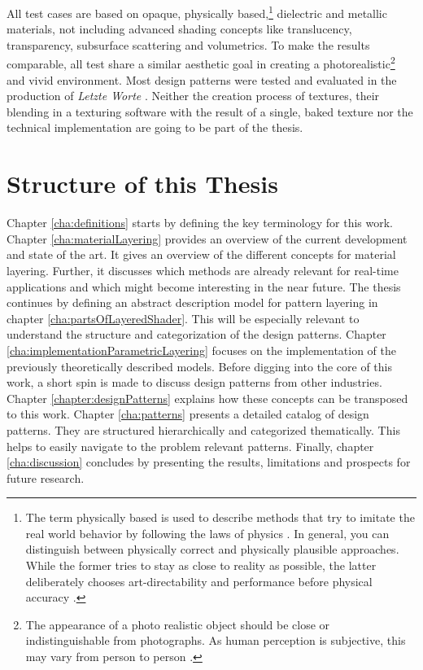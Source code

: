 All test cases are based on opaque, physically based,\footnote{The term physically based is used to describe  methods that try to imitate the real world behavior by following the laws of physics \cite[p.\,1]{pharr2016physically}. In general, you can distinguish between physically correct and physically plausible approaches. While the former tries to stay as close to reality as possible, the latter deliberately chooses art-directability and performance before physical accuracy \cite[p.\,12]{burley2012physically}\cite[p.\,2]{wes2018comprehensivevol2}.} dielectric and metallic materials, not including advanced shading concepts like translucency, transparency, subsurface scattering and volumetrics. To make the results comparable, all test share a similar aesthetic goal in creating a photorealistic\footnote{The appearance of a photo realistic object should be close or indistinguishable from photographs. As human perception is subjective, this may vary from person to person \cite[p.\,4]{pharr2016physically}\cite[p.\,99]{akenine2008real}.} and vivid environment. Most design patterns were tested and evaluated in the production of \emph{Letzte Worte} \cite{letzteWorte2019game}. Neither the creation process of textures, their blending in a texturing software with the result of a single, baked texture nor the technical implementation are going to be part of the thesis.

 

\section{Structure of this Thesis}

Chapter \ref{cha:definitions} starts by defining the key terminology for this work. Chapter \ref{cha:materialLayering} provides an overview of the current development and state of the art. It gives an overview of the different concepts for material layering. Further, it discusses which methods are already relevant for real-time applications and which might become interesting in the near future. The thesis continues  by defining an abstract description model for pattern layering in chapter \ref{cha:partsOfLayeredShader}. This will be especially relevant to understand the structure and categorization of the design patterns. Chapter \ref{cha:implementationParametricLayering} focuses on the implementation of the previously theoretically described models. Before digging into the core of this work, a short spin is made to discuss design patterns from other industries. Chapter \ref{chapter:designPatterns} explains how these concepts can be transposed to this work. Chapter \ref{cha:patterns} presents a detailed catalog of design patterns. They are structured hierarchically and categorized thematically. This helps to easily navigate to the problem relevant patterns. Finally, chapter \ref{cha:discussion} concludes by presenting the results, limitations and prospects for  future research. 
